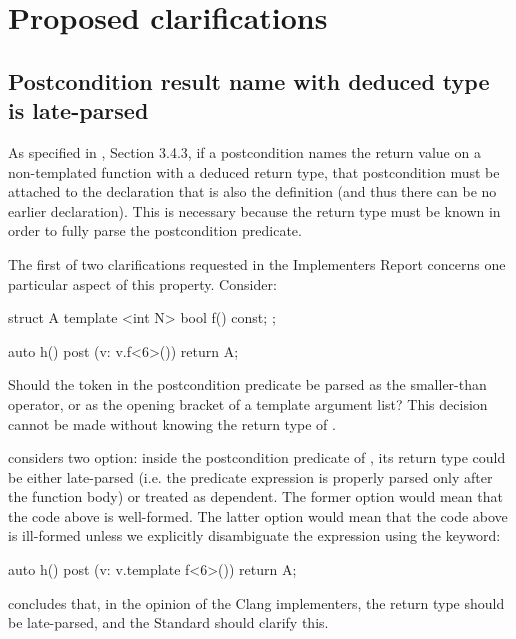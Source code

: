 





\section{Proposed clarifications}

\subsection{Postcondition result name with deduced type is late-parsed}

As specified in \cite{P2900R10}, Section 3.4.3, if a postcondition names the return value on a non-templated function with a deduced return type, that postcondition must be attached to the declaration that is also the definition (and thus there
can be no earlier declaration). This is necessary because the return type must be known in order to fully parse the postcondition predicate.

The first of two clarifications requested in the Implementers Report \cite{P3460R0} concerns one particular aspect of this property. Consider:
\begin{codeblock}
struct A {
  template <int N> bool f() const;
};

auto h()
post (v: v.f<6>()) {
  return A{};
}
\end{codeblock}
Should the token \tcode{<} in the postcondition predicate be parsed as the smaller-than operator, or as the opening bracket of a template argument list? This decision cannot be made without knowing the return type of .

\cite{P3460R0} considers two option: inside the postcondition predicate of , its return type could be either late-parsed (i.e. the predicate expression is properly parsed only after the function body) or treated as dependent. The former option would mean that the code above is well-formed. The latter option would mean that the code above is ill-formed unless we explicitly disambiguate the expression using the  keyword:
\begin{codeblock}
auto h()
post (v: v.template f<6>()) {
  return A{};
}
\end{codeblock}
\cite{P3460R0} concludes that, in the opinion of the Clang implementers, the return type should be late-parsed, and the Standard should clarify this.


